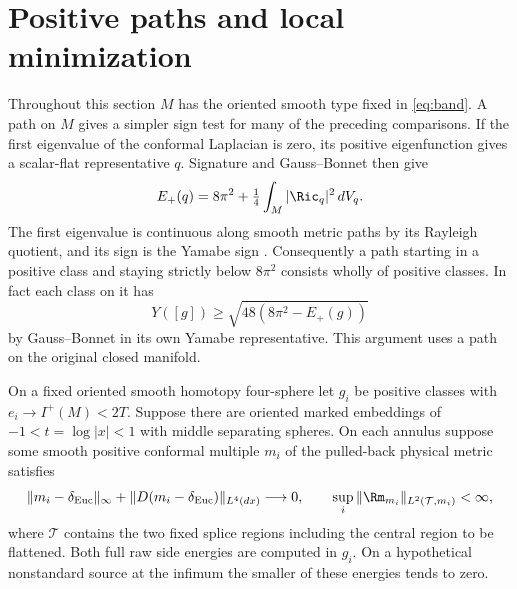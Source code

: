 \section{Positive paths and local minimization}\label{sec:local-min}

Throughout this section \(M\) has the oriented smooth type fixed in
\eqref{eq:band}. A path on \(M\) gives a simpler sign test for
many of the preceding comparisons. If the first eigenvalue of the
conformal Laplacian is zero, its positive eigenfunction gives a
scalar-flat representative \(q\). Signature and Gauss--Bonnet then give
\begin{equation}\label{eq:zero-wall}
 E_+(q)=8\pi^2+\tfrac14\int_M|\Ric_q|^2\,dV_q .
\end{equation}
The first eigenvalue is continuous along smooth metric paths by its
Rayleigh quotient, and its sign is the Yamabe sign
\cite[\S2]{LeeParker1987Yamabe}. Consequently a path starting in a
positive class and staying strictly below \(8\pi^2\) consists wholly
of positive classes. In fact each class on it has
\[
 Y([g])\ge\sqrt{48(8\pi^2-E_+(g))}
\]
by Gauss--Bonnet in its own Yamabe representative. This argument
uses a path on the original closed manifold.

\begin{proposition}\label{prop:short-cut}
On a fixed oriented smooth homotopy four-sphere let \(g_i\) be positive
classes with \(e_i\to I^+(M)<2T\). Suppose there are oriented marked
embeddings of \(-1<t=\log|x|<1\) with middle separating spheres.
On each annulus suppose some smooth positive conformal multiple \(m_i\) of
the pulled-back physical metric satisfies
\[
 \|m_i-\delta_{\rm Euc}\|_\infty+
 \|D(m_i-\delta_{\rm Euc})\|_{L^4(dx)}\longrightarrow0,\qquad
 \sup_i\|\Rm_{m_i}\|_{L^2(\mathcal T,m_i)}<\infty ,
\]
where \(\mathcal T\) contains the two fixed splice regions including
the central region to be flattened. Both full raw side energies are
computed in \(g_i\). On a hypothetical nonstandard source at the
infimum the smaller of these energies tends to zero.
\end{proposition}


